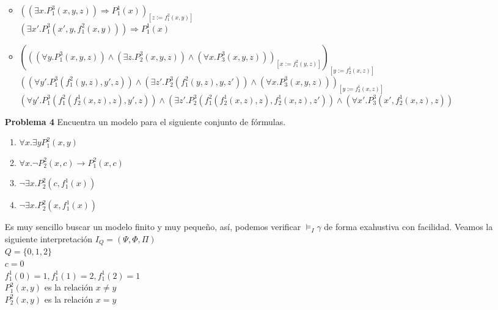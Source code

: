 \documentclass{article}
\begin{document}
\begin{enumerate}
\begin{itemize}
\item $((\exists x . P_1^3(x,y,z)) \Rightarrow P_1^1(x))_{[z:=f_1^2(x,y)]}$\\
$(\exists x' . P_1^3(x',y,f_1^2(x,y))) \Rightarrow P_1^1(x)$

\item $(((\forall y . P_1^3(x,y,z)) \wedge (\exists z . P_2^3(x,y,z)) \wedge(\forall x . P_3^3(x,y,z)))_{[x:=f_1^2(y,z)]})_{[y:=f_2^1(x,z)]} $\\
$((\forall y' . P_1^3(f_1^2(y,z),y',z)) \wedge (\exists z' . P_2^3(f_1^2(y,z),y,z')) \wedge(\forall x . P_3^3(x,y,z)))_{[y:=f_2^1(x,z)]} $
$(\forall y' . P_1^3(f_1^2(f_2^1(x,z),z),y',z)) \wedge (\exists z' . P_2^3(f_1^2(f_2^1(x,z),z),f_2^1(x,z),z')) \wedge(\forall x' . P_3^3(x',f_2^1(x,z),z)) $

\end{itemize}


\item[\bf{Problema 4}] Encuentra un modelo para el siguiente conjunto de fórmulas.
\begin{enumerate}
\item $\forall x. \exists y P_1^2(x,y)$
\item $\forall x. \neg P_2^2(x,c) \rightarrow P_1^2(x,c) $
\item $\neg \exists x . P_2^2(c,f_1^1(x))$
\item $\neg \exists x . P_2^2(x,f_1^1(x))$
\end{enumerate}

Es muy sencillo buscar un modelo finito y muy pequeño, así, podemos verificar $\models_I \gamma$ de forma exahustiva con facilidad.
Veamos la siguiente interpretación $I_Q=(\Psi,\Phi,\Pi)$\\
$Q=\{0,1,2\}$\\
$c=0$\\
$f_1^1(0)=1,f_1^1(1)=2,f_1^1(2)=1$\\
$P_1^2(x,y)$ es la relación $x\not=y$\\
$P_2^2(x,y)$ es la relación $x=y$


\end{enumerate}
\end{document}
